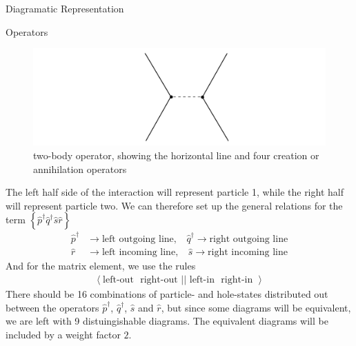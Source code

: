 \documentclass[twoside,english]{uiofysmaster}
\begin{document}
\begin{chapter}{Diagramatic Representation}
\begin{section}{Operators}
		\begin{figure}[H]
			\includegraphics[width=\textwidth]{Figures/TwoBodyOperator0.pdf}
			\caption{two-body operator, showing the horizontal line and four creation or annihilation operators}
			\label{Figure:TwoBodyOperator0}
		\end{figure}
		The left half side of the interaction will represent particle 1, while the right half will represent particle two. We can therefore set up the general relations for the term $\left\{ \hat p^\dagger \hat q^\dagger \hat s \hat r \right\}$
		\begin{align}
			\nonumber \hat p^\dagger &\rightarrow \text{left outgoing line}, \:\:\:\: \hat q^\dagger \rightarrow \text{right outgoing line} \\
			\nonumber \hat r &\rightarrow \text{left incoming line}, \:\:\:\: \hat s \rightarrow \text{right incoming line} 
		\end{align}
		And for the matrix element, we use the rules 
		\begin{align}
			\left< \text{left-out } \text{ right-out } | | \text{ left-in } \text{ right-in } \right>
		\end{align}
		There should be 16 combinations of particle- and hole-states distributed out between the operators $\hat p^\dagger$, $\hat q^\dagger$, $\hat s$ and $\hat r$, but since some diagrams will be equivalent, we are left with 9 distuingishable diagrams. The equivalent diagrams will be included by a weight factor $2$. 


\end{section}
\end{chapter}
\end{document}
